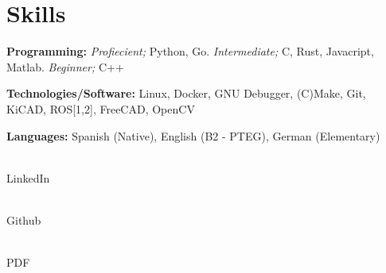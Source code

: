 \documentclass[letterpaper,11pt]{article}
\newcommand{\resumeSubHeadingListStart}{\begin{itemize}[leftmargin=0.15in, label={}]}
\newcommand{\resumeSubHeadingListEnd}{\end{itemize}}
\begin{document}
\section{Skills}
  \vspace{2pt}
  \resumeSubHeadingListStart
    \small{\item{
        \textbf{Programming:}{
	    \textit{Profiecient;} Python, Go.
	    \textit{Intermediate;} C, Rust, Javacript, Matlab.
	    \textit{Beginner;} C++} \\
	\vspace{3pt}
        
	\textbf{Technologies/Software:}{ Linux, Docker, GNU Debugger, (C)Make, Git, KiCAD, ROS[1,2], FreeCAD, OpenCV} \\ \vspace{3pt}
        
        \textbf{Languages:}{ Spanish (Native), English (B2 - PTEG), German (Elementary)}
        
    }}
  \resumeSubHeadingListEnd


\setlength{\columnsep}{-10cm} %

\begin{center}
    \begin{multicols}{3}
	 \vspace{1.2pt} \\ LinkedIn

	 \vspace{1.2pt} \\ Github

	 \vspace{1.2pt} \\ PDF
    \end{multicols}
\end{center}
\end{document}
